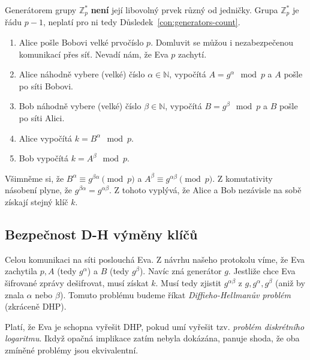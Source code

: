 \documentclass[
  program=infoi,
  biblatex,
  figures=false,
  glossaries,
  index
]{kidiplom}
\begin{document}
        \begin{remark}
            Generátorem grupy $\mathbb{Z}^*_p$ \textbf{není} její libovolný prvek různý od jedničky.
            Grupa $\mathbb{Z}^*_p$ je řádu $p-1$, neplatí pro ni tedy Důsledek~\ref{con:generators-count}.
        \end{remark}


        \begin{enumerate}
            \item
                Alice pošle Bobovi velké prvočíslo $p$.
                Domluvit se můžou i nezabezpečenou komunikací přes síť. Nevadí nám, že Eva $p$ zachytí.
            \item
                Alice náhodně vybere (velké) číslo $\alpha \in \mathbb{N}$, vypočítá $A=g^\alpha \mod{p}$ a $A$ pošle po síti Bobovi.
            \item
                Bob náhodně vybere (velké) číslo $\beta \in \mathbb{N}$, vypočítá $B=g^\beta \mod{p}$ a $B$ pošle po síti Alici.
            \item
                Alice vypočítá $k=B^\alpha \mod{p}$.
            \item
                Bob vypočítá $k=A^\beta \mod{p}$.

        \end{enumerate}

        Všimněme si, že $B^\alpha \equiv g^{\beta \alpha} \pmod{p}$ a $A^\beta \equiv g^{\alpha \beta} \pmod{p}$. Z komutativity násobení
        plyne, že $g^{\beta \alpha} = g^{\alpha \beta}$. Z tohoto vyplývá, že Alice a Bob nezávisle na sobě získají stejný klíč $k$.


    \subsection{Bezpečnost D-H výměny klíčů}\label{subsec:diffie-hellman-security}

        Celou komunikaci na síti poslouchá Eva. Z návrhu našeho protokolu víme, že Eva zachytila $p, A$ (tedy $g^\alpha$) a $B$ (tedy $g^\beta$).
        Navíc zná generátor $g$.
        Jestliže chce Eva šifrované zprávy dešifrovat, musí získat $k$.
        Musí tedy zjistit $g^{\alpha \beta}$ z $g, g^\alpha, g^\beta$ (aniž by znala $\alpha$ nebo $\beta$).
        Tomuto problému budeme říkat \emph{Diffieho-Hellmanův problém} (zkráceně DHP).


        Platí, že Eva je schopna vyřešit DHP, pokud umí vyřešit tzv. \emph{problém diskrétního logaritmu}.
        Ikdyž opačná implikace zatím nebyla dokázána, panuje shoda, že oba zmíněné problémy jsou ekvivalentní.
\end{document}
